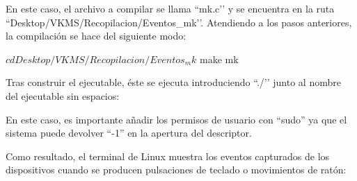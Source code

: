 En este caso, el archivo a compilar se llama ``mk.c’’ y se encuentra en la ruta ``Desktop/VKMS/Recopilacion/Eventos\_mk’’. Atendiendo a los pasos anteriores, la compilación se hace del siguiente modo: \\

\begin{bashcode}
$ cd Desktop/VKMS/Recopilacion/Eventos_mk
$ make mk
\end{bashcode}

Tras construir el ejecutable, éste se ejecuta introduciendo ``./’’ junto al nombre del ejecutable sin espacios: \\


En este caso, es importante añadir los permisos de usuario con ``sudo'' ya que el sistema puede devolver ``-1'' en la apertura del descriptor.

Como resultado, el terminal de Linux muestra los eventos capturados de los dispositivos cuando se producen pulsaciones de teclado o movimientos de ratón: \\

